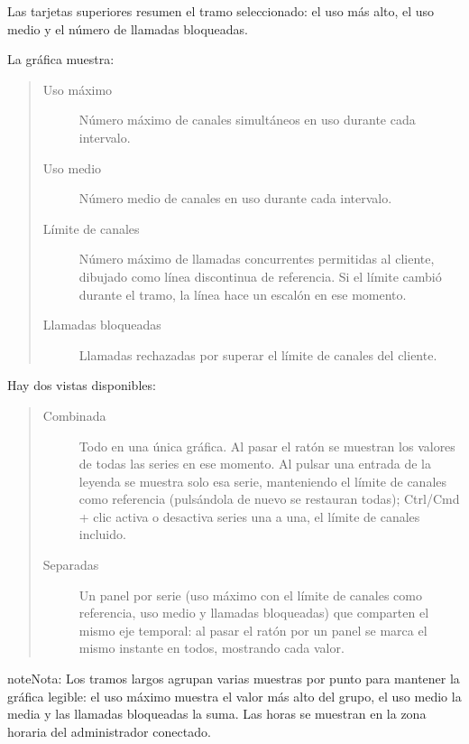 \documentclass[letterpaper,10pt,spanish]{sphinxmanual}
\begin{document}
Las tarjetas superiores resumen el tramo seleccionado: el uso más alto, el uso medio y el número de llamadas bloqueadas.

La gráfica muestra:
\begin{quote}
\begin{description}
\item[{Uso máximo}] \leavevmode
Número máximo de canales simultáneos en uso durante cada intervalo.

\item[{Uso medio}] \leavevmode
Número medio de canales en uso durante cada intervalo.

\item[{Límite de canales}] \leavevmode
Número máximo de llamadas concurrentes permitidas al cliente, dibujado como línea discontinua de referencia. Si el límite cambió durante el tramo, la línea hace un escalón en ese momento.

\item[{Llamadas bloqueadas}] \leavevmode
Llamadas rechazadas por superar el límite de canales del cliente.

\end{description}
\end{quote}

Hay dos vistas disponibles:
\begin{quote}
\begin{description}
\item[{Combinada}] \leavevmode
Todo en una única gráfica. Al pasar el ratón se muestran los valores de todas las series en ese momento. Al pulsar una entrada de la leyenda se muestra solo esa serie, manteniendo el límite de canales como referencia (pulsándola de nuevo se restauran todas); Ctrl/Cmd + clic activa o desactiva series una a una, el límite de canales incluido.

\item[{Separadas}] \leavevmode
Un panel por serie (uso máximo con el límite de canales como referencia, uso medio y llamadas bloqueadas) que comparten el mismo eje temporal: al pasar el ratón por un panel se marca el mismo instante en todos, mostrando cada valor.

\end{description}
\end{quote}

\begin{notice}{note}{Nota:}
Los tramos largos agrupan varias muestras por punto para mantener la gráfica legible: el uso máximo muestra el valor más alto del grupo, el uso medio la media y las llamadas bloqueadas la suma. Las horas se muestran en la zona horaria del administrador conectado.
\end{notice}
\end{document}
